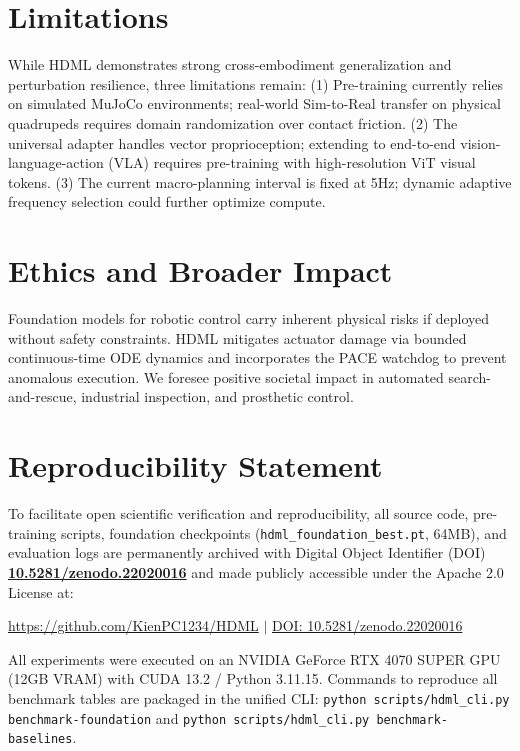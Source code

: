 \documentclass{article}
\begin{document}
\section{Limitations}
\label{sec:limitations}
While HDML demonstrates strong cross-embodiment generalization and perturbation resilience, three limitations remain: (1) Pre-training currently relies on simulated MuJoCo environments; real-world Sim-to-Real transfer on physical quadrupeds requires domain randomization over contact friction. (2) The universal adapter handles vector proprioception; extending to end-to-end vision-language-action (VLA) requires pre-training with high-resolution ViT visual tokens. (3) The current macro-planning interval is fixed at 5Hz; dynamic adaptive frequency selection could further optimize compute.

\section{Ethics and Broader Impact}
\label{sec:ethics}
Foundation models for robotic control carry inherent physical risks if deployed without safety constraints. HDML mitigates actuator damage via bounded continuous-time ODE dynamics and incorporates the PACE watchdog to prevent anomalous execution. We foresee positive societal impact in automated search-and-rescue, industrial inspection, and prosthetic control.

\section{Reproducibility Statement}
\label{sec:reproducibility}
To facilitate open scientific verification and reproducibility, all source code, pre-training scripts, foundation checkpoints (\texttt{hdml\_foundation\_best.pt}, 64MB), and evaluation logs are permanently archived with Digital Object Identifier (DOI) \href{https://doi.org/10.5281/zenodo.22020016}{\textbf{10.5281/zenodo.22020016}} and made publicly accessible under the Apache 2.0 License at:
\begin{center}
\url{https://github.com/KienPC1234/HDML} \quad $\mid$ \quad \href{https://doi.org/10.5281/zenodo.22020016}{DOI: 10.5281/zenodo.22020016}
\end{center}
All experiments were executed on an NVIDIA GeForce RTX 4070 SUPER GPU (12GB VRAM) with CUDA 13.2 / Python 3.11.15. Commands to reproduce all benchmark tables are packaged in the unified CLI: \texttt{python scripts/hdml\_cli.py benchmark-foundation} and \texttt{python scripts/hdml\_cli.py benchmark-baselines}.



\end{document}
